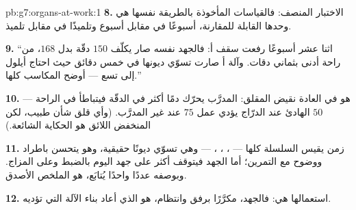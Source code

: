 \begin{solution}{pb:g7:organs-at-work:1}
\textbf{8.} الاختبار المنصف: فالقياسات المأخوذة بالطريقة نفسها هي
وحدها القابلة للمقارنة، أسبوعًا في مقابل أسبوع وتلميذًا في مقابل
تلميذ.

\textbf{9.} ``اثنا عشر أسبوعًا رفعت سقف أ: فالجهد نفسه صار يكلّف
$150$ دقّة بدل $168$، من  راحة أدنى بثماني دقات. وآلة أ صارت
تسوّي ديونها في خمس دقائق حيث احتاج أيلول إلى تسع --- 
أوضح المكاسب كلها.''

\textbf{10.} هو في العادة نقيض المقلق:  المدرَّب يحرّك دمًا
أكثر في الدقّة فيتباطأ في الراحة ---  $50$ الهادئ عند الدرّاج
يؤدي عمل $75$ عند غير المدرَّب. (وأي قلق شأن طبيب، لكن المنخفض
اللائق هو الحكاية الشائعة.)

\textbf{11.} زمن  يقيس السلسلة كلها --- ، ،
،  --- وهي تسوّي ديونًا حقيقية، وهو يتحسن باطراد
ووضوح مع التمرين؛ أما  الجهد فيتوقف أكثر على جهد اليوم بالضبط
وعلى المزاج. وبوصفه عددًا واحدًا يُتابَع،  هو الملخص الأصدق.

\textbf{12.} استعمالها هي: فالجهد، مكرَّرًا برفق وانتظام، هو الذي
أعاد بناء الآلة التي تؤديه.
\end{solution}
